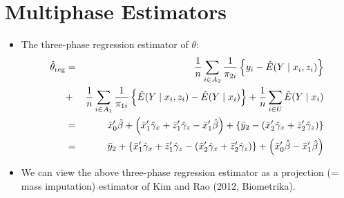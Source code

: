 
\section*{Multiphase Estimators}

\begin{itemize}
  \item The three-phase regression estimator of $\theta$:
  \begin{eqnarray*} 
    \hat{\theta}_{\rm reg} &=& \frac{1}{n} \sum_{i \in A_2}\frac{1}{ \pi_{2i}
    }\left\{ y_{i}  - \hat{E} ( Y \mid x_i, z_{i} ) \right\} \\
    &+& \frac{1}{n} \sum_{i \in A_1}\frac{1}{ \pi_{1i}  }\left\{ \hat{E} ( Y
    \mid x_i, z_{i} ) - \hat{E} ( Y \mid x_i ) \right\} + \frac{1}{n} \sum_{i
    \in U} \hat{E} ( Y \mid x_i ) \\
    &=& \bar{x}_0' \hat{\beta} + \left( \bar{x}_1' \hat{\gamma}_x + \bar{z}_1'
    \hat{\gamma}_z - \bar{x}_1' \hat{\beta} \right) + \{ \bar{y}_2- (\bar{x}_2'
    \hat{\gamma}_x + \bar{z}_2' \hat{\gamma}_z ) \} \\
    &=& \bar{y}_2 + \{ \bar{x}_1' \hat{\gamma}_x + \bar{z}_1' \hat{\gamma}_z  -
    (\bar{x}_2' \hat{\gamma}_x + \bar{z}_2' \hat{\gamma}_z ) \} +\left(
    \bar{x}_0' \hat{\beta} - \bar{x}_1' \hat{\beta} \right) 
  \end{eqnarray*} 
  \item We can view the above three-phase regression estimator as a projection
    (= mass imputation) estimator of Kim and Rao (2012, Biometrika).
  
\end{itemize}

\newpage
